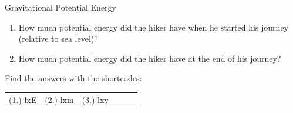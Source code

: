 \begin{exercises}{Gravitational Potential Energy }
\begin{enumerate}[noitemsep, label=\textbf{\arabic*}. ]
\begin{enumerate}[noitemsep, label=\textbf{\alph*}. ]
\label{m38784*uid60}\item How much potential energy did the hiker have when he started his journey (relative to sea level)?
\label{m38784*uid61}\item How much potential energy did the hiker have at the end of his journey?
\end{enumerate}
                \end{enumerate}
  \label{m38784**end}
\par {} Find the answers with the shortcodes:
 \par \begin{tabular}[h]{cccccc}
 (1.) lxE  &  (2.) lxm  &  (3.) lxy  & \end{tabular}
\end{exercises}
